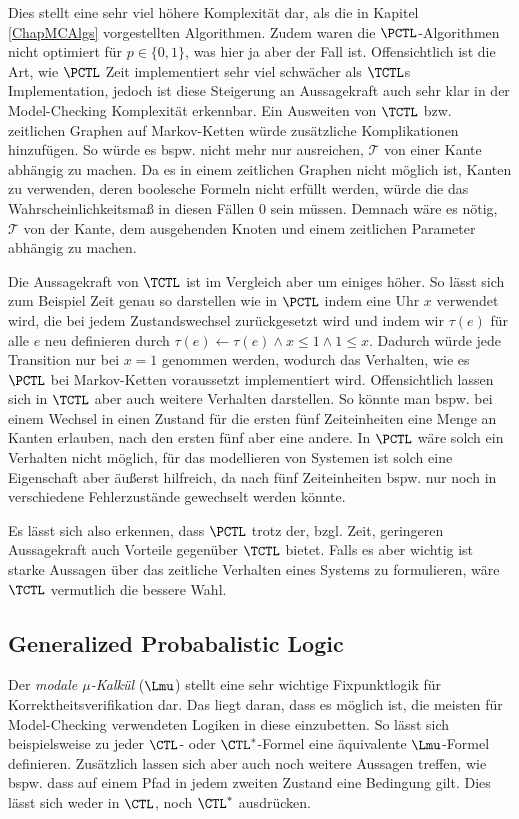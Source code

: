 Dies stellt eine sehr viel höhere Komplexität dar, als die in Kapitel \ref{ChapMCAlgs} vorgestellten Algorithmen.
Zudem waren die $\PCTL$-Algorithmen nicht optimiert für $p\in \{0,1\}$, was hier ja aber der Fall ist.
Offensichtlich ist die Art, wie $\PCTL$ Zeit implementiert sehr viel schwächer als $\TCTL$s Implementation, jedoch ist diese Steigerung an Aussagekraft auch sehr klar in der Model-Checking Komplexität erkennbar.
Ein Ausweiten von $\TCTL$ bzw. zeitlichen Graphen auf Markov-Ketten würde zusätzliche Komplikationen hinzufügen.
So würde es bspw. nicht mehr nur ausreichen, $\mathcal{T}$ von einer Kante abhängig zu machen.
Da es in einem zeitlichen Graphen nicht möglich ist, Kanten zu verwenden, deren boolesche Formeln nicht erfüllt werden, würde die das Wahrscheinlichkeitsmaß in diesen Fällen $0$ sein müssen.
Demnach wäre es nötig, $\mathcal{T}$ von der Kante, dem ausgehenden Knoten und einem zeitlichen Parameter abhängig zu machen.

Die Aussagekraft von $\TCTL$ ist im Vergleich aber um einiges höher.
So lässt sich zum Beispiel Zeit genau so darstellen wie in $\PCTL$ indem eine Uhr $x$ verwendet wird, die bei jedem Zustandswechsel zurückgesetzt wird und indem wir $\tau(e)$ für alle $e$ neu definieren durch $\tau(e)\gets \tau(e) \land x\leq 1 \land 1\leq x$.
Dadurch würde jede Transition nur bei $x=1$ genommen werden, wodurch das Verhalten, wie es $\PCTL$ bei Markov-Ketten voraussetzt implementiert wird.
Offensichtlich lassen sich in $\TCTL$ aber auch weitere Verhalten darstellen.
So könnte man bspw. bei einem Wechsel in einen Zustand für die ersten fünf Zeiteinheiten eine Menge an Kanten erlauben, nach den ersten fünf aber eine andere.
In $\PCTL$ wäre solch ein Verhalten nicht möglich, für das modellieren von Systemen ist solch eine Eigenschaft aber äußerst hilfreich, da nach fünf Zeiteinheiten bspw. nur noch in verschiedene Fehlerzustände gewechselt werden könnte.

Es lässt sich also erkennen, dass $\PCTL$ trotz der, bzgl. Zeit, geringeren Aussagekraft auch Vorteile gegenüber $\TCTL$ bietet.
Falls es aber wichtig ist starke Aussagen über das zeitliche Verhalten eines Systems zu formulieren, wäre $\TCTL$ vermutlich die bessere Wahl.


\subsection{Generalized Probabalistic Logic}

Der \textit{modale $\mu$-Kalkül} ($\Lmu$) stellt eine sehr wichtige Fixpunktlogik für Korrektheitsverifikation dar.
Das liegt daran, dass es möglich ist, die meisten für Model-Checking verwendeten Logiken in diese einzubetten. So lässt sich beispielsweise zu jeder $\CTL$- oder $\CTL^*$-Formel eine äquivalente $\Lmu$-Formel definieren.
Zusätzlich lassen sich aber auch noch weitere Aussagen treffen, wie bspw. dass auf einem Pfad in jedem zweiten Zustand eine Bedingung gilt.
Dies lässt sich weder in $\CTL$, noch $\CTL^*$ ausdrücken. \cite{cleaveland2005probabilistic}

